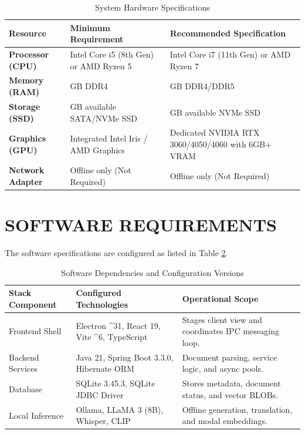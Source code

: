 \documentclass[12pt,a4paper]{report}
\begin{document}
\begin{table}[!ht]
\centering
\footnotesize
\begin{tabularx}{\textwidth}{|>{\hsize=0.8\hsize}X | >{\hsize=1.1\hsize}X | >{\hsize=1.1\hsize}X|}
\hline
\textbf{Resource} & \textbf{Minimum Requirement} & \textbf{Recommended Specification} \\ \hline
\textbf{Processor (CPU)} & Intel Core i5 (8th Gen) or AMD Ryzen 5 & Intel Core i7 (11th Gen) or AMD Ryzen 7 \\ \hline
\textbf{Memory (RAM)} & 16 GB DDR4 & 32 GB DDR4/DDR5 \\ \hline
\textbf{Storage (SSD)} & 20 GB available SATA/NVMe SSD & 50 GB available NVMe SSD \\ \hline
\textbf{Graphics (GPU)} & Integrated Intel Iris / AMD Graphics & Dedicated NVIDIA RTX 3060/4050/4060 with 6GB+ VRAM \\ \hline
\textbf{Network Adapter} & Offline only (Not Required) & Offline only (Not Required) \\ \hline
\end{tabularx}
\caption{System Hardware Specifications}
\label{tab:hardware_requirements}
\end{table}

\section{SOFTWARE REQUIREMENTS}
The software specifications are configured as listed in Table \ref{tab:software_requirements}.

\begin{table}[!ht]
\centering
\footnotesize
\begin{tabularx}{\textwidth}{|>{\hsize=0.8\hsize}X | >{\hsize=1.0\hsize}X | >{\hsize=1.2\hsize}X|}
\hline
\textbf{Stack Component} & \textbf{Configured Technologies} & \textbf{Operational Scope} \\ \hline
Frontend Shell & Electron \^{}31, React 19, Vite \^{}6, TypeScript & Stages client view and coordinates IPC messaging loop. \\ \hline
Backend Services & Java 21, Spring Boot 3.3.0, Hibernate ORM & Document parsing, service logic, and async pools. \\ \hline
Database & SQLite 3.45.3, SQLite JDBC Driver & Stores metadata, document status, and vector BLOBs. \\ \hline
Local Inference & Ollama, LLaMA 3 (8B), Whisper, CLIP & Offline generation, translation, and modal embeddings. \\ \hline
\end{tabularx}
\caption{Software Dependencies and Configuration Versions}
\label{tab:software_requirements}
\end{table}
\end{document}

